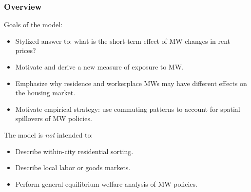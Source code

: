 \documentclass[aspectratio=169, t]{beamer}
\begin{document}
\begin{frame}
    \frametitle{Overview}
    
    Goals of the model:
    \begin{itemize}
        \item Stylized answer to: what is the short-term effect of MW changes in rent prices?
        \item Motivate and derive a new measure of exposure to MW.
        \item Emphasize why residence and workerplace MWs may have different effects on the housing market.
        \item Motivate empirical strategy: use commuting patterns to account for spatial spillovers of MW policies.
    \end{itemize}
    
    \pause
    \vspace{2mm}
    The model is \textit{not} intended to:
    \begin{itemize}
        \item Describe within-city residential sorting.
        \item Describe local labor or goods markets.
        \item Perform general equilibrium welfare analysis of MW policies.
    \end{itemize}
\end{frame}
\end{document}
